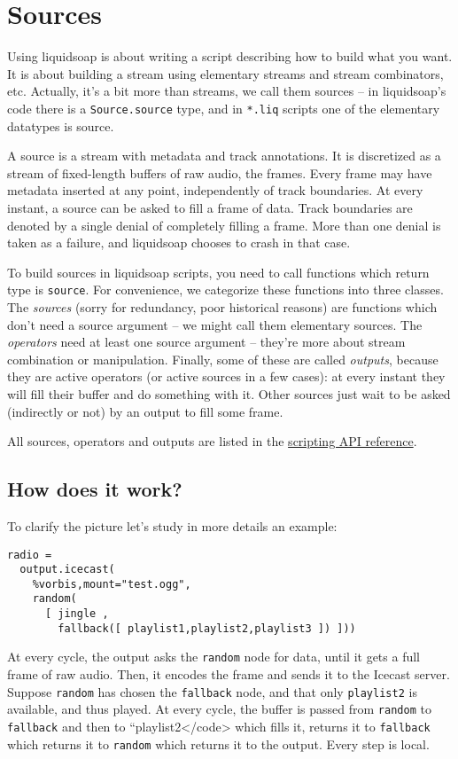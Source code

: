 \section{Sources}
Using liquidsoap is about writing a script describing how to build what you want. It is about building a stream using elementary streams and stream combinators, etc. Actually, it's a bit more than streams, we call them sources -- in liquidsoap's code there is a \verb+Source.source+ type, and in \verb+*.liq+ scripts one of the elementary datatypes is source.

A source is a stream with metadata and track annotations. It is discretized as a stream of fixed-length buffers of raw audio, the frames. Every frame may have metadata inserted at any point, independently of track boundaries. At every instant, a source can be asked to fill a frame of data. Track boundaries are denoted by a single denial of completely filling a frame. More than one denial is taken as a failure, and liquidsoap chooses to crash in that case.

To build sources in liquidsoap scripts, you need to call functions which return type is \verb+source+. For convenience, we categorize these functions into three classes. The \emph{sources} (sorry for redundancy, poor historical reasons) are functions which don't need a source argument -- we might call them elementary sources. The \emph{operators} need at least one source argument -- they're more about stream combination or manipulation. Finally, some of these are called \emph{outputs}, because they are active operators (or active sources in a few cases): at every instant they will fill their buffer and do something with it. Other sources just wait to be asked (indirectly or not) by an output to fill some frame.

All sources, operators and outputs are listed in the \href{reference.html}{scripting API reference}.

\subsection{How does it work?}
To clarify the picture let's study in more details an example:

\begin{verbatim}
radio =
  output.icecast(
    %vorbis,mount="test.ogg",
    random(
      [ jingle ,
        fallback([ playlist1,playlist2,playlist3 ]) ]))
\end{verbatim}
At every cycle, the output asks the \verb+random+ node for data,
until it gets a full frame of raw audio.
Then, it encodes the frame and sends it to the Icecast server.
Suppose \verb+random+ has chosen the \verb+fallback+ node,
and that only \verb+playlist2+ is available, and thus played.
At every cycle, the buffer is passed from \verb+random+ to
\verb+fallback+ and then to ``playlist2</code> which fills it,
returns it to \verb+fallback+ which returns it to \verb+random+
which returns it to the output. Every step is local.

